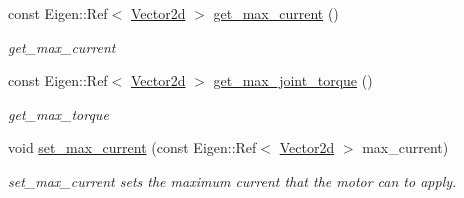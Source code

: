 \begin{DoxyCompactItemize}
const Eigen\+::\+Ref$<$ \hyperlink{common__header_8hpp_acb6916bc8c9fe9d98c484fd4cc201447}{Vector2d} $>$ \hyperlink{classblmc__robots_1_1Stuggihop_a5a68ae4700c53672c30d373cc3b5b66c}{get\+\_\+max\+\_\+current} ()
\begin{DoxyCompactList}\small\item\em get\+\_\+max\+\_\+current \end{DoxyCompactList}\item 
const Eigen\+::\+Ref$<$ \hyperlink{common__header_8hpp_acb6916bc8c9fe9d98c484fd4cc201447}{Vector2d} $>$ \hyperlink{classblmc__robots_1_1Stuggihop_a4d0344d8fa31e2e959dfcb3c3f5538e9}{get\+\_\+max\+\_\+joint\+\_\+torque} ()
\begin{DoxyCompactList}\small\item\em get\+\_\+max\+\_\+torque \end{DoxyCompactList}\item 
void \hyperlink{classblmc__robots_1_1Stuggihop_a8be641fdc498b04a52bb721f14c449c3}{set\+\_\+max\+\_\+current} (const Eigen\+::\+Ref$<$ \hyperlink{common__header_8hpp_acb6916bc8c9fe9d98c484fd4cc201447}{Vector2d} $>$ max\+\_\+current)
\begin{DoxyCompactList}\small\item\em set\+\_\+max\+\_\+current sets the maximum current that the motor can to apply. \end{DoxyCompactList}\end{DoxyCompactItemize}
